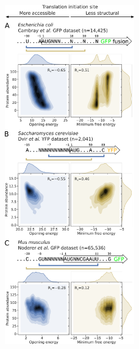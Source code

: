 \begin{figure}
\includegraphics[width=0.5\textwidth]{chapters/TIsigner/Figs/fig1.png}

\end{figure}
